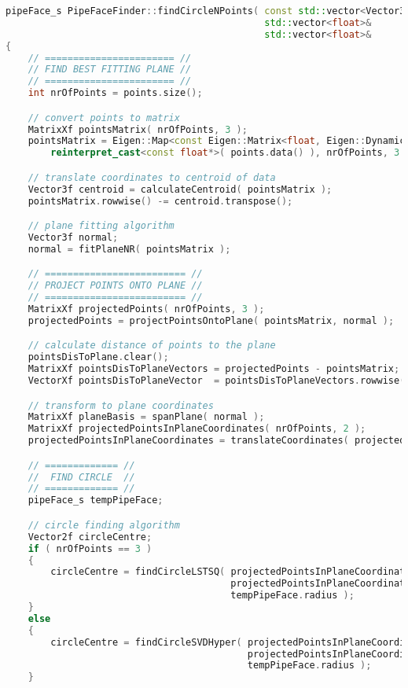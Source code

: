 \begin{lstlisting}[language=C++, caption={Refactored pipe face finder.}, label={lst:find_circle_n_points}]
    pipeFace_s PipeFaceFinder::findCircleNPoints( const std::vector<Vector3f>& points,
                                              std::vector<float>&          pointsDisToPlane,
                                              std::vector<float>&          pointsDisToCircle )
{
    // ======================= //
    // FIND BEST FITTING PLANE //
    // ======================= //
    int nrOfPoints = points.size();

    // convert points to matrix
    MatrixXf pointsMatrix( nrOfPoints, 3 );
    pointsMatrix = Eigen::Map<const Eigen::Matrix<float, Eigen::Dynamic, 3, Eigen::RowMajor>>(
        reinterpret_cast<const float*>( points.data() ), nrOfPoints, 3 );

    // translate coordinates to centroid of data
    Vector3f centroid = calculateCentroid( pointsMatrix );
    pointsMatrix.rowwise() -= centroid.transpose();

    // plane fitting algorithm
    Vector3f normal;
    normal = fitPlaneNR( pointsMatrix );

    // ========================= //
    // PROJECT POINTS ONTO PLANE //
    // ========================= //
    MatrixXf projectedPoints( nrOfPoints, 3 );
    projectedPoints = projectPointsOntoPlane( pointsMatrix, normal );

    // calculate distance of points to the plane
    pointsDisToPlane.clear();
    MatrixXf pointsDisToPlaneVectors = projectedPoints - pointsMatrix;
    VectorXf pointsDisToPlaneVector  = pointsDisToPlaneVectors.rowwise().norm();

    // transform to plane coordinates
    MatrixXf planeBasis = spanPlane( normal );
    MatrixXf projectedPointsInPlaneCoordinates( nrOfPoints, 2 );
    projectedPointsInPlaneCoordinates = translateCoordinates( projectedPoints, planeBasis );

    // ============= //
    //  FIND CIRCLE  //
    // ============= //
    pipeFace_s tempPipeFace;

    // circle finding algorithm
    Vector2f circleCentre;
    if ( nrOfPoints == 3 )
    {
        circleCentre = findCircleLSTSQ( projectedPointsInPlaneCoordinates.col( 0 ),
                                        projectedPointsInPlaneCoordinates.col( 1 ),
                                        tempPipeFace.radius );
    }
    else
    {
        circleCentre = findCircleSVDHyper( projectedPointsInPlaneCoordinates.col( 0 ),
                                           projectedPointsInPlaneCoordinates.col( 1 ),
                                           tempPipeFace.radius );
    }


\end{lstlisting}
